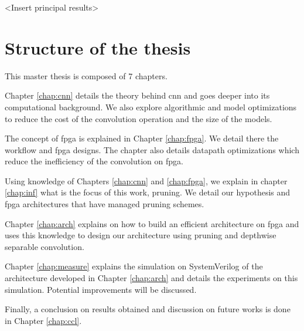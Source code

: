 <Insert principal results>
%
%
\section*{Structure of the thesis}
%
%
This master thesis is composed of 7 chapters.

Chapter \ref{chap:cnn} details the theory behind \acrshort{cnn} and goes deeper into its computational background. We also explore algorithmic and model optimizations to reduce the cost of the convolution operation and the size of the models.

The concept of \acrshort{fpga} is explained in Chapter \ref{chap:fpga}. We detail there the workflow and \acrshort{fpga} designs. The chapter also details datapath optimizations which reduce the inefficiency of the convolution on \acrshort{fpga}.

Using knowledge of Chapters \ref{chap:cnn} and \ref{chap:fpga}, we explain in chapter \ref{chap:inf} what is the focus of this work, pruning. We detail our hypothesis and \acrshort{fpga} architectures that have managed pruning schemes.

Chapter \ref{chap:arch} explains on how to build an efficient architecture on \acrshort{fpga} and uses this knowledge to design our architecture using pruning and depthwise separable convolution.

Chapter \ref{chap:measure} explains the simulation on SystemVerilog of the architecture developed in Chapter \ref{chap:arch} and details the experiments on this simulation. Potential improvements will be discussed.

Finally, a conclusion on results obtained and discussion on future works is done in Chapter \ref{chap:ccl}.

\afterpage{\blankpage}
\cleardoublepage
\newpage
